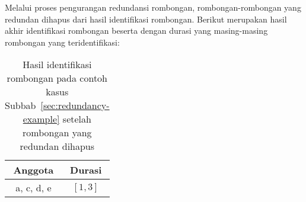 Melalui proses pengurangan redundansi rombongan, rombongan-rombongan yang redundan dihapus dari hasil identifikasi rombongan. Berikut merupakan hasil akhir identifikasi rombongan beserta dengan durasi yang masing-masing rombongan yang teridentifikasi:

\begin{table}[h]
    \centering
    \captionsetup{width=0.75\textwidth}
    \caption{Hasil identifikasi rombongan pada contoh kasus Subbab~\ref{sec:redundancy-example} setelah rombongan yang redundan dihapus}
    \begin{tabular}{|c|c|}
        \hline
        Anggota & Durasi \\
        \hline
        a, c, d, e & $[1, 3]$ \\
        \hline
    \end{tabular}
    \label{bab6:contoh-identifikasi-redundan-setelah}
\end{table}

